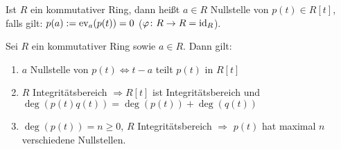 \documentclass[12pt,a4paper]{scrartcl}
\begin{document}
\begin{defi}
	Ist $R$ ein kommutativer Ring, dann heißt $a\in R$ Nullstelle von $p(t) \in R[t]$, falls gilt: $p(a) := \operatorname{ev}_a(p(t)) = 0$ ($\varphi\colon R\to R = \operatorname{id}_R$).
\end{defi}


\begin{satz}\label{thm:nullstelle_eigenschaft}
	Sei $R$ ein kommutativer Ring sowie $a\in R$. Dann gilt:
	\begin{enumerate}
		\item $a$ Nullstelle von $p(t) \Leftrightarrow t-a$ teilt $p(t)$ in $R[t]$
		\item $R$ Integritätsbereich $\Rightarrow R[t]$ ist Integritätsbereich und $\deg(p(t)q(t)) = \deg (p(t)) + \deg (q(t))$
		\item $\deg (p(t)) = n\geq 0$, $R$ Integritätsbereich $\Rightarrow$ $p(t)$ hat maximal $n$ verschiedene Nullstellen.
	\end{enumerate}
\end{satz}


\end{document}
